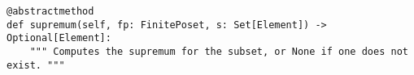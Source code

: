 \begin{verbatim}
@abstractmethod
def supremum(self, fp: FinitePoset, s: Set[Element]) -> Optional[Element]:
    """ Computes the supremum for the subset, or None if one does not exist. """
\end{verbatim}